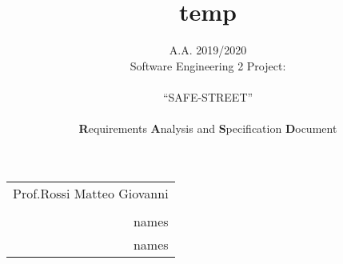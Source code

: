 \documentclass[english]{article}
\newcommand{\forcerighttext}[1]{
\vspace{0.4\textheight}
\par {\raggedleft \begin{tabular}{r}\ignorespaces
#1
\end{tabular}
\hspace{8em}
\vspace{1em}
\par}
}
\begin{document}
\begin{doublespace}

\title{temp}

\author{A.A. 2019/2020\\
Software Engineering 2 Project: \\
\\
{\LARGE{}``SAFE-STREET''}\textbf{}\\
\\
\textbf{R}equirements \textbf{A}nalysis and \textbf{S}pecification
\textbf{D}ocument\\
}
\end{doublespace}

\maketitle
\thispagestyle{empty}
\forcerighttext{Prof.Rossi Matteo Giovanni\\
\\
names\\names}


\newpage{}

\tableofcontents{}

\newpage

\listoffigures

\newpage

\listoftables

\newpage{}


\end{document}
